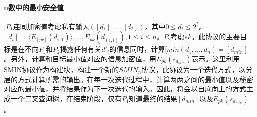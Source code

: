 \paragraph{n数中的最小安全值}.$P_1$连同加密值考虑私有输入$([d_1],...,[d_2])$，其中$0\leq d_i \leq 2^l$，$[d_i]=\langle E_[pk](d_{i,1})\rangle,...,E_{pk}(d_(i,l)),1\leq i \leq n$。$P_2$考虑$sk$。此协议的主要目标是在不向$P_1$和$P_2$揭露任何有关$d'_i$的信息同时，计算$[min(d_1,...,d_n)=[d_{min}]$。另外，计算和目标最小值对应的信息加密值，用$E_{pk}(s_{d_{min}})$表示。这里利用SMIN协议作为构建块，构建一个新的$SMIN_n$协议，此协议为一个迭代方式，以分层的方式计算所需的输出。在每一次迭代过程中，计算两两之间的最小值以及秘密对应的最小值，并将结果作为下一次迭代的输入。因此，将会以自底向上的方式生成一个二叉查询树。在结束阶段，仅有$P_1$知道最终的结果$[d_{min}]$以及$E_{pk}(s_{d_{min}})$。

